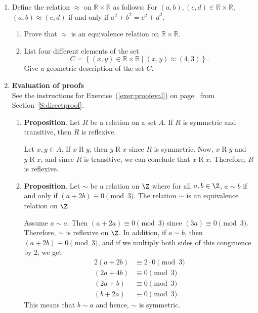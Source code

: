 \begin{enumerate}
\item Define the relation  $ \approx $ on  $\mathbb{R} \times \mathbb{R}$ as follows:  
\label{exer:sec72-circles}%
For  $\left( {a, b} \right), \left( {c, d} \right) \in \mathbb{R} \times \mathbb{R}$,  $\left( {a, b} \right) \approx \left( {c, d} \right)$ if and only if 
$a^2  + b^2  = c^2  + d^2 $.

\begin{enumerate}
  \item Prove that   $ \approx $ is an equivalence relation on  $\mathbb{R} \times \mathbb{R}$.

  \item List  four  different elements of the set 
  \[
C = \left\{ { {\left( {x, y} \right) \in \mathbb{R} \times \mathbb{R} } \mid                 \left( {x, y} \right) \approx \left( {4, 3} \right)} \right\}.
\]
  \yitem Give a geometric description of the set  $C$.
\end{enumerate}


\item \textbf{Evaluation of proofs}  \hfill \\
See the instructions for Exercise~(\ref{exer:proofeval}) on 
page~\pageref{exer:proofeval} from Section~\ref{S:directproof}.

\begin{enumerate}
\item \textbf{Proposition}. Let $R$ be a relation on a set $A$.  If $R$ is symmetric and transitive, then $R$ is reflexive.

\begin{myproof}
Let $x, y \in A$.  If $x \mathrel{R} y$, then $y \mathrel{R} x$ since $R$ is symmetric.  Now, 
$x \mathrel{R} y$ and $y \mathrel{R} x$, and since $R$ is transitive, we can conclude that 
$x \mathrel{R} x$.  Therefore, $R$ is reflexive. 
\end{myproof}

\item \textbf{Proposition}. Let $\sim$ be a relation on $\Z$ where for all $a, b \in \Z$,  
$a \sim b$ if and only if $\left( a + 2b \right) \equiv 0 \pmod 3$.  The relation 
$\sim$ is an equivalence relation on $\Z$.

\begin{myproof}
Assume $a \sim a$.  Then $\left( a + 2a \right) \equiv 0 \pmod 3$ since \linebreak
$\left( 3a \right) \equiv 0 \pmod 3$. Therefore, $\sim$ is reflexive on $\Z$.  In addition, if 
$a \sim b$, then $\left( a + 2b \right) \equiv 0 \pmod 3$, and if we multiply both sides of this congruence by 2, we get
\begin{align*}
2\left( a + 2b \right) &\equiv 2 \cdot 0 \pmod 3 \\
\left( 2a + 4b \right) &\equiv 0 \pmod 3 \\
\left( 2a + b \right) &\equiv 0 \pmod 3 \\
\left( b + 2a \right) &\equiv 0 \pmod 3. 
\end{align*}
This means that $b \sim a$ and hence, $\sim$ is symmetric.


\end{myproof}
\end{enumerate}
\end{enumerate}
